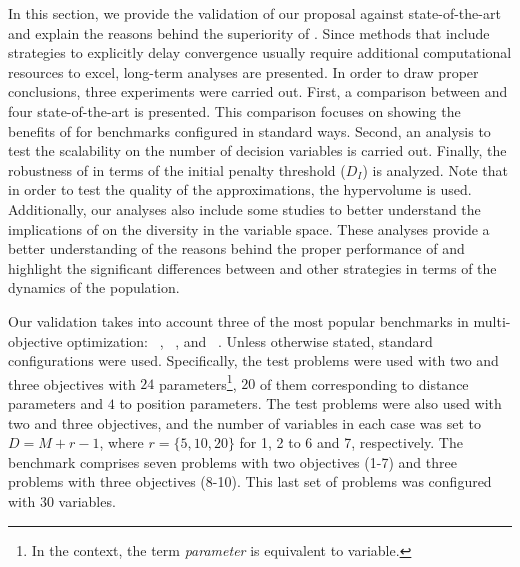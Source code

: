 In this section, we provide the validation of our proposal against state-of-the-art \MOEAS{} and
explain the reasons behind the superiority of \AVSDMOEAD{}.
%
%
Since methods that include strategies to explicitly delay convergence usually require additional computational
resources to excel, long-term analyses are presented.
%
In order to draw proper conclusions, three experiments were carried out.
%
First, a comparison between \AVSDMOEAD{} and four state-of-the-art \MOEAS{} is presented.
%
This comparison focuses on showing the benefits of \AVSDMOEAD{} for benchmarks 
configured in standard ways.
%
Second, an analysis to test the scalability on the number of decision variables is carried out.
%
Finally, the robustness of \AVSDMOEAD{} in terms of the initial penalty threshold ($D_I$) is analyzed.
%
Note that in order to test the quality of the approximations, the hypervolume is used.
%
Additionally, our analyses also include some studies to better understand
the implications of \AVSDMOEAD{} on the diversity in the variable space.
%
These analyses provide a better understanding of the reasons behind the proper performance of \AVSDMOEAD{}
and highlight the significant differences between \AVSDMOEAD{} and other strategies in terms of the dynamics
of the population.



Our validation takes into account three of the most popular benchmarks in multi-objective optimization:
\WFG{}~\cite{huband2006review}, \DTLZ{}~\cite{deb2005scalable}, and \UF{}~\cite{zhang2008multiobjective}.
%
Unless otherwise stated, standard configurations were used.
%
Specifically, the \WFG{} test problems were used with two and three objectives with $24$ 
parameters\footnote{In the \WFG{} context, the term \textit{parameter} is equivalent to variable.}, 
$20$ of them corresponding to distance parameters and $4$ to position parameters.
%
The \DTLZ{} test problems were also used with two and three objectives, and the number of variables in each
case was set to $D=M+r-1$, where $r=\{5, 10, 20\}$ for \DTLZ{}1, \DTLZ{}2 to \DTLZ{}6 and \DTLZ{}7, respectively.
% 
The \UF{} benchmark comprises seven problems with two objectives (\UF{}1-7) and three problems with three objectives (\UF{}8-10).
%
This last set of problems was configured with $30$ variables.

